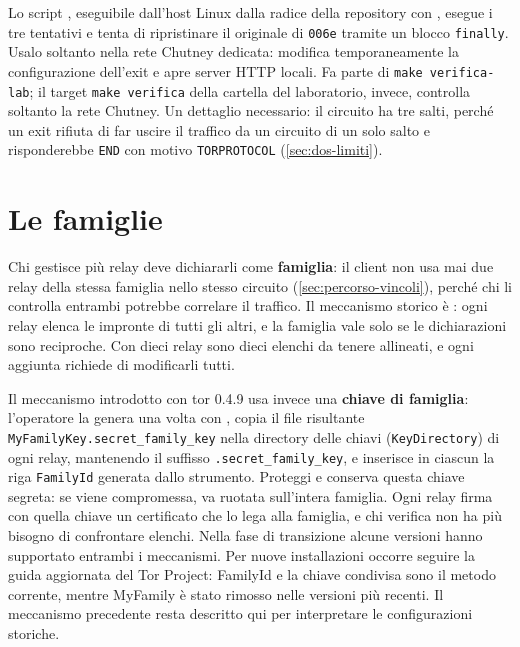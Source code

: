 Lo script , eseguibile dall'host Linux dalla radice della repository con , esegue i tre tentativi e tenta di ripristinare il  originale di \texttt{006e} tramite un blocco \texttt{finally}. Usalo soltanto nella rete Chutney dedicata: modifica temporaneamente la configurazione dell'exit e apre server HTTP locali. Fa parte di \texttt{make verifica-lab}; il target \texttt{make verifica} della cartella del laboratorio, invece, controlla soltanto la rete Chutney. Un dettaglio necessario: il circuito ha tre salti, perché un exit rifiuta di far uscire il traffico da un circuito di un solo salto e risponderebbe \texttt{END} con motivo \texttt{TORPROTOCOL} (\cref{sec:dos-limiti}).

\section{Le famiglie}\label{sec:relay-famiglie}

Chi gestisce più relay deve dichiararli come \textbf{famiglia}: il client non usa mai due relay della stessa famiglia nello stesso circuito (\cref{sec:percorso-vincoli}), perché chi li controlla entrambi potrebbe correlare il traffico. Il meccanismo storico è : ogni relay elenca le impronte di tutti gli altri, e la famiglia vale solo se le dichiarazioni sono reciproche. Con dieci relay sono dieci elenchi da tenere allineati, e ogni aggiunta richiede di modificarli tutti.

Il meccanismo introdotto con tor 0.4.9 usa invece una \textbf{chiave di famiglia}: l'operatore la genera una volta con , copia il file risultante \texttt{MyFamilyKey.secret\_family\_key} nella directory delle chiavi (\texttt{KeyDirectory}) di ogni relay, mantenendo il suffisso \texttt{.secret\_family\_key}, e inserisce in ciascun  la riga \texttt{FamilyId} generata dallo strumento. Proteggi e conserva questa chiave segreta: se viene compromessa, va ruotata sull'intera famiglia. Ogni relay firma con quella chiave un certificato che lo lega alla famiglia, e chi verifica non ha più bisogno di confrontare elenchi. Nella fase di transizione alcune versioni hanno supportato entrambi i meccanismi. Per nuove installazioni occorre seguire la guida aggiornata del Tor Project: FamilyId e la chiave condivisa sono il metodo corrente, mentre MyFamily è stato rimosso nelle versioni più recenti. Il meccanismo precedente resta descritto qui per interpretare le configurazioni storiche.

